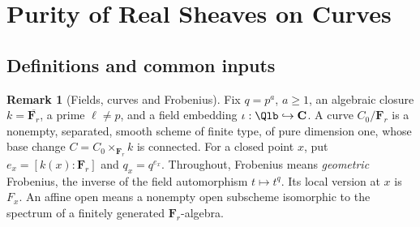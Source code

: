 \documentclass[11pt]{article}
\theoremstyle{plain}
\theoremstyle{definition}
\newtheorem{remark}[theorem]{Remark}
\newcommand{\Fq}{\mathbf F_{r}}
\begin{document}
\section{Purity of Real Sheaves on Curves}
\label{sec:purity-real-sheaves}
\begin{abstract}
content: purity of real sheaves on curves
\\key theorem: Thm \ref{p:real-purity}
\\references: mainly by KW, but the CFT and representation theory part is replaced by detailed blueprint
\end{abstract}

\subsection{Definitions and common inputs}

\begin{remark}[Fields, curves and Frobenius]\label{d:real-setup}
Fix $q=p^a$, $a\ge1$, an algebraic closure $k=\overline{\Fq}$, a prime
$\ell\ne p$, and a field embedding $\iota:\Qlb\hookrightarrow\mathbf C$.
A curve $C_0/\Fq$ is a nonempty, separated, smooth scheme of finite type,
of pure dimension one, whose base change $C=C_0\times_{\Fq}k$ is connected.
For a closed point $x$, put $e_x=[k(x):\Fq]$ and $q_x=q^{e_x}$.
Throughout, Frobenius means \emph{geometric} Frobenius, the inverse of
the field automorphism $t\mapsto t^q$. Its local version at $x$ is $F_x$.
An affine open means a nonempty open subscheme isomorphic to the spectrum
of a finitely generated $\Fq$-algebra.
\end{remark}
\end{document}
